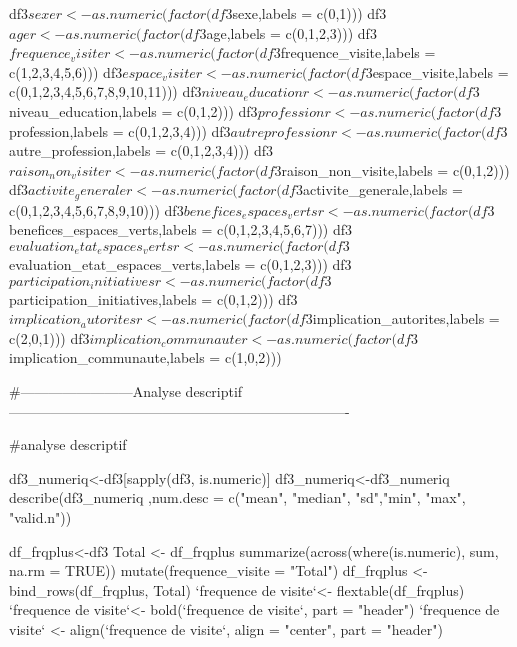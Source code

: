 df3$sexer<-as.numeric(factor(df3$sexe,labels = c(0,1)))
df3$ager<-as.numeric(factor(df3$age,labels = c(0,1,2,3)))
df3$frequence_visiter<-as.numeric(factor(df3$frequence_visite,labels = c(1,2,3,4,5,6)))
df3$espace_visiter<-as.numeric(factor(df3$espace_visite,labels = c(0,1,2,3,4,5,6,7,8,9,10,11)))
df3$niveau_educationr<-as.numeric(factor(df3$niveau_education,labels = c(0,1,2)))
df3$professionr <-as.numeric(factor(df3$profession,labels = c(0,1,2,3,4)))
df3$autreprofessionr <-as.numeric(factor(df3$autre_profession,labels = c(0,1,2,3,4)))
df3$raison_non_visiter <-as.numeric(factor(df3$raison_non_visite,labels = c(0,1,2)))
df3$activite_generaler <-as.numeric(factor(df3$activite_generale,labels = c(0,1,2,3,4,5,6,7,8,9,10)))
df3$benefices_espaces_vertsr<-as.numeric(factor(df3$benefices_espaces_verts,labels = c(0,1,2,3,4,5,6,7)))
df3$evaluation_etat_espaces_vertsr<-as.numeric(factor(df3$evaluation_etat_espaces_verts,labels = c(0,1,2,3)))
df3$participation_initiativesr<-as.numeric(factor(df3$participation_initiatives,labels = c(0,1,2)))
df3$implication_autoritesr<-as.numeric(factor(df3$implication_autorites,labels = c(2,0,1)))
df3$implication_communauter<-as.numeric(factor(df3$implication_communaute,labels = c(1,0,2)))


#------------------------Analyse descriptif-------------------------------------------------------------------------

#analyse descriptif

df3_numeriq<-df3[sapply(df3, is.numeric)]
df3_numeriq<-df3_numeriq%
describe(df3_numeriq ,num.desc = c("mean", "median", "sd","min", "max", "valid.n"))





df_frqplus<-df3%
Total <- df_frqplus %
  summarize(across(where(is.numeric), sum, na.rm = TRUE)) %
  mutate(frequence_visite = "Total")
df_frqplus <- bind_rows(df_frqplus, Total)
`frequence de visite`<- flextable(df_frqplus)
`frequence de visite`<- bold(`frequence de visite`, part = "header")
`frequence de visite` <- align(`frequence de visite`, align = "center", part = "header")






